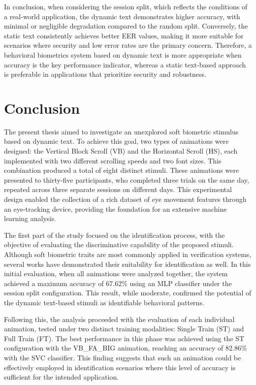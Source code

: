 \documentclass[12pt]{report}
\begin{document}
In conclusion, when considering the session split, which reflects the conditions of a real-world application, the dynamic text demonstrates higher accuracy, with minimal or negligible degradation compared to the random split.
Conversely, the static text consistently achieves better EER values, making it more suitable for scenarios where security and low error rates are the primary concern.
Therefore, a behavioral biometrics system based on dynamic text is more appropriate when accuracy is the key performance indicator, whereas a static text-based approach is preferable in applications that prioritize security and robustness.

\FloatBarrier
\newpage

\chapter{Conclusion}

The present thesis aimed to investigate an unexplored soft biometric stimulus based on dynamic text. 
To achieve this goal, two types of animations were designed: the Vertical Block Scroll (VB) and the Horizontal Scroll (HS), each implemented with two different scrolling speeds and two font sizes.
This combination produced a total of eight distinct stimuli. 
These animations were presented to thirty-five participants, who completed three trials on the same day, repeated across three separate sessions on different days. 
This experimental design enabled the collection of a rich dataset of eye movement features through an eye-tracking device, providing the foundation for an extensive machine learning analysis.

The first part of the study focused on the identification process, with the objective of evaluating the discriminative capability of the proposed stimuli. 
Although soft biometric traits are most commonly applied in verification systems, several works have demonstrated their suitability for identification as well. 
In this initial evaluation, when all animations were analyzed together, the system achieved a maximum accuracy of 67.62\% using an MLP classifier under the session split configuration. 
This result, while moderate, confirmed the potential of the dynamic text-based stimuli as identifiable behavioral patterns.

Following this, the analysis proceeded with the evaluation of each individual animation, tested under two distinct training modalities: Single Train (ST) and Full Train (FT). 
The best performance in this phase was achieved using the ST configuration with the VB\_FA\_BIG animation, reaching an accuracy of 82.86\% with the SVC classifier. 
This finding suggests that such an animation could be effectively employed in identification scenarios where this level of accuracy is sufficient for the intended application.
\end{document}
